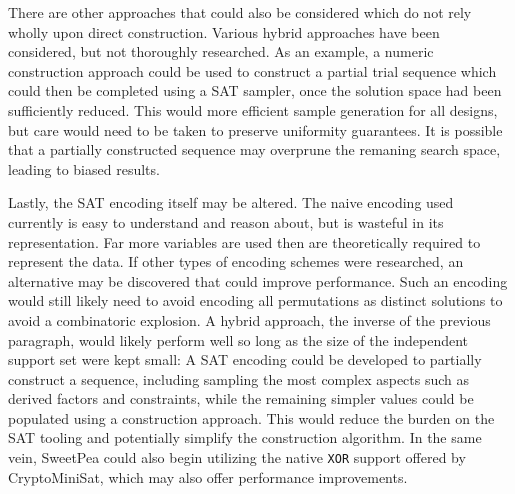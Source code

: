 There are other approaches that could also be considered which do not rely wholly upon direct construction. Various hybrid approaches have been considered, but not thoroughly researched. As an example, a numeric construction approach could be used to construct a partial trial sequence which could then be completed using a SAT sampler, once the solution space had been sufficiently reduced. This would more efficient sample generation for all designs, but care would need to be taken to preserve uniformity guarantees. It is possible that a partially constructed sequence may overprune the remaning search space, leading to biased results.

Lastly, the SAT encoding itself may be altered. The naive encoding used currently is easy to understand and reason about, but is wasteful in its representation. Far more variables are used then are theoretically required to represent the data. If other types of encoding schemes were researched, an alternative may be discovered that could improve performance. Such an encoding would still likely need to avoid encoding all permutations as distinct solutions to avoid a combinatoric explosion. A hybrid approach, the inverse of the previous paragraph, would likely perform well so long as the size of the independent support set were kept small: A SAT encoding could be developed to partially construct a sequence, including sampling the most complex aspects such as derived factors and constraints, while the remaining simpler values could be populated using a construction approach. This would reduce the burden on the SAT tooling and potentially simplify the construction algorithm. In the same vein, SweetPea could also begin utilizing the native \texttt{XOR} support offered by CryptoMiniSat, which may also offer performance improvements.
